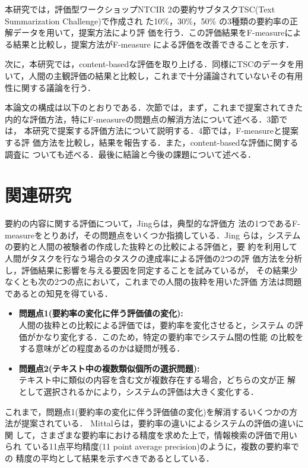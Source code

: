 本研究では，評価型ワークショップNTCIR 2の要約サブタスクTSC(Text
Summarization Challenge)\cite{Fukushima:2001a,Fukushima:2001b}で作成され
た10\%，30\%，50\% の3種類の要約率の正解データを用いて，提案方法により評
価を行う．この評価結果をF-measureによる結果と比較し，提案方法がF-measure
による評価を改善できることを示す．

次に，本研究では，content-basedな評価を取り上げる．同様にTSCのデータを用
いて，人間の主観評価の結果と比較し，これまで十分議論されていないその有用
性に関する議論を行う．

本論文の構成は以下のとおりである．次節では，まず，これまで提案されてきた
内的な評価方法，特にF-measureの問題点の解消方法について述べる．3節では，
本研究で提案する評価方法について説明する．4節では，F-measureと提案する評
価方法を比較し，結果を報告する．また，content-basedな評価に関する調査に
ついても述べる．最後に結論と今後の課題について述べる．


\section{関連研究}



要約の内容に関する評価について，Jingら\cite{jing:98:a}は，典型的な評価方
法の1つであるF-measureをとりあげ，その問題点をいくつか指摘している．Jing 
らは，システムの要約と人間の被験者の作成した抜粋との比較による評価と，要
約を利用して人間がタスクを行なう場合のタスクの達成率による評価の2つの評
価方法を分析し，評価結果に影響を与える要因を同定することを試みているが，
その結果少なくとも次の2つの点において，これまでの人間の抜粋を用いた評価
方法は問題であるとの知見を得ている．

\begin{itemize}
 \item {\bf 問題点1(要約率の変化に伴う評価値の変化):}\\
       人間の抜粋との比較による評価では，要約率を変化させると，システム
       の評価がかなり変化する．このため，特定の要約率でシステム間の性能
       の比較をする意味がどの程度あるのかは疑問が残る．
 \item {\bf 問題点2(テキスト中の複数類似個所の選択問題):}\\
       テキスト中に類似の内容を含む文が複数存在する場合，どちらの文が正
       解として選択されるかにより，システムの評価は大きく変化する．
\end{itemize}


これまで，問題点1(要約率の変化に伴う評価値の変化)を解消するいくつかの方
法が提案されている．
Mittalら\cite{mittal:99:a}は，要約率の違いによるシステムの評価の違いに関
して，さまざまな要約率における精度を求めた上で，情報検索の評価で用いられ
ている11点平均精度(11 point average precision)のように，複数の要約率での
精度の平均として結果を示すべきであるとしている．

